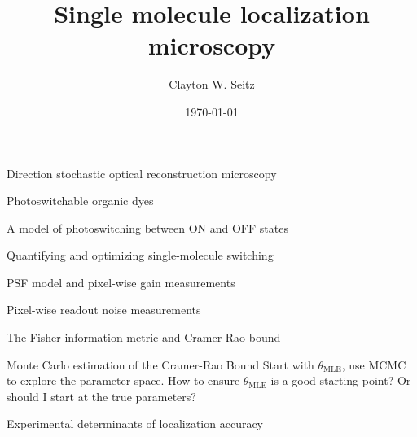 \documentclass[aspectratio=169]{beamer}
\title{Single molecule localization microscopy}	%
\author{Clayton W. Seitz}								%
\date{\today}									%
\begin{document}
\begin{frame}
  \titlepage
\end{frame}

\begin{frame}{Direction stochastic optical reconstruction microscopy}
\end{frame}

\begin{frame}{Photoswitchable organic dyes}
\end{frame}

\begin{frame}{A model of photoswitching between ON and OFF states}
\end{frame}

\begin{frame}{Quantifying and optimizing single-molecule switching}
\end{frame}

\begin{frame}{PSF model and pixel-wise gain measurements}
\end{frame}

\begin{frame}{Pixel-wise readout noise measurements}
\end{frame}

\begin{frame}{The Fisher information metric and Cramer-Rao bound}
\end{frame}

\begin{frame}{Monte Carlo estimation of the Cramer-Rao Bound}
Start with $\theta_{\mathrm{MLE}}$, use MCMC to explore the parameter space. How to ensure $\theta_{\mathrm{MLE}}$ is a good starting point? Or should I start at the true parameters?
\end{frame}

\begin{frame}{Experimental determinants of localization accuracy}
\end{frame}
\end{document}
